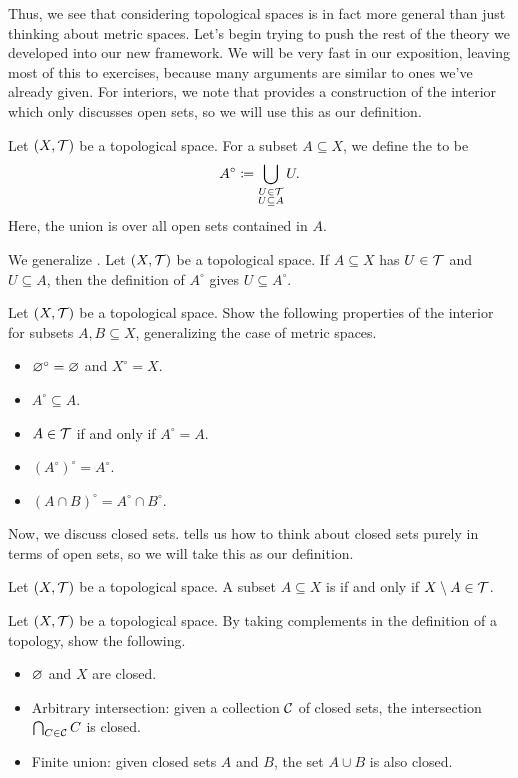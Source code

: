 \documentclass[../main.tex]{subfiles}
\begin{document}
Thus, we see that considering topological spaces is in fact more general than just thinking about metric spaces. Let's begin trying to push the rest of the theory we developed into our new framework. We will be very fast in our exposition, leaving most of this to exercises, because many arguments are similar to ones we've already given. For interiors, we note that  provides a construction of the interior which only discusses open sets, so we will use this as our definition.
\begin{definition}[interior]
    Let $(X,\mathcal{T})$ be a topological space. For a subset $A\subseteq X$, we define the  to be
    \[A^\circ\coloneqq\bigcup_{\substack{U\in\mathcal{T}\\U\subseteq A}}U.\]
    Here, the union is over all open sets contained in $A$.
\end{definition}
\begin{example}
    We generalize . Let $(X,\mathcal{T})$ be a topological space. If $A\subseteq X$ has $U\in\mathcal{T}$ and $U\subseteq A$, then the definition of $A^\circ$ gives $U\subseteq A^\circ$.
\end{example}
\begin{exe}
    Let $(X,\mathcal{T})$ be a topological space. Show the following properties of the interior for subsets $A,B\subseteq X$, generalizing the case of metric spaces.
    \begin{itemize}
        \item $\varnothing^\circ=\varnothing$ and $X^\circ=X$.
        \item $A^\circ\subseteq A$.
        \item $A\in\mathcal{T}$ if and only if $A^\circ=A$.
        \item $(A^\circ)^\circ=A^\circ$.
        \item $(A\cap B)^\circ=A^\circ\cap B^\circ$.
    \end{itemize}
\end{exe}
Now, we discuss closed sets.  tells us how to think about closed sets purely in terms of open sets, so we will take this as our definition.
\begin{definition}[closed]
    Let $(X,\mathcal{T})$ be a topological space. A subset $A\subseteq X$ is  if and only if $X\setminus A\in\mathcal{T}$.
\end{definition}
\begin{exe}
    Let $(X,\mathcal{T})$ be a topological space. By taking complements in the definition of a topology, show the following.
    \begin{itemize}
        \item $\varnothing$ and $X$ are closed.
        \item Arbitrary intersection: given a collection $\mathcal{C}$ of closed sets, the intersection $\bigcap_{C\in\mathcal{C}}C$ is closed.
        \item Finite union: given closed sets $A$ and $B$, the set $A\cup B$ is also closed.
    \end{itemize}
\end{exe}
\end{document}
